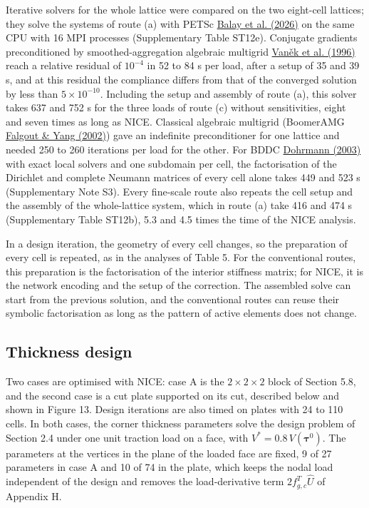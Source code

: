 \documentclass[preprint,12pt,authoryear]{elsarticle}
\begin{document}
Iterative solvers for the whole lattice were compared on the two eight-cell lattices; they solve the systems of route (a) with PETSc \href{https://petsc.org/release/manual/}{Balay et al. (2026)} on the same CPU with 16 MPI processes (Supplementary Table ST12e). Conjugate gradients preconditioned by smoothed-aggregation algebraic multigrid \href{https://doi.org/10.1007/BF02238511}{Vaněk et al. (1996)} reach a relative residual of \(10^{-4}\) in 52 to 84 s per load, after a setup of 35 and 39 s, and at this residual the compliance differs from that of the converged solution by less than \(5\times10^{-10}\). Including the setup and assembly of route (a), this solver takes 637 and 752 s for the three loads of route (c) without sensitivities, eight and seven times as long as NICE. Classical algebraic multigrid (BoomerAMG \href{https://doi.org/10.1007/3-540-47789-6_66}{Falgout \& Yang (2002)}) gave an indefinite preconditioner for one lattice and needed 250 to 260 iterations per load for the other. For BDDC \href{https://doi.org/10.1137/S1064827502412887}{Dohrmann (2003)} with exact local solvers and one subdomain per cell, the factorisation of the Dirichlet and complete Neumann matrices of every cell alone takes 449 and 523 s (Supplementary Note S3). Every fine-scale route also repeats the cell setup and the assembly of the whole-lattice system, which in route (a) take 416 and 474 s (Supplementary Table ST12b), 5.3 and 4.5 times the time of the NICE analysis.

In a design iteration, the geometry of every cell changes, so the preparation of every cell is repeated, as in the analyses of Table 5. For the conventional routes, this preparation is the factorisation of the interior stiffness matrix; for NICE, it is the network encoding and the setup of the correction. The assembled solve can start from the previous solution, and the conventional routes can reuse their symbolic factorisation as long as the pattern of active elements does not change.

\subsection{Thickness design}

Two cases are optimised with NICE: case A is the \(2\times2\times2\) block of Section 5.8, and the second case is a cut plate supported on its cut, described below and shown in Figure 13. Design iterations are also timed on plates with 24 to 110 cells. In both cases, the corner thickness parameters solve the design problem of Section 2.4 under one unit traction load on a face, with \(V^*=0.8\,V(\boldsymbol\tau^0)\). The parameters at the vertices in the plane of the loaded face are fixed, 9 of 27 parameters in case A and 10 of 74 in the plate, which keeps the nodal load independent of the design and removes the load-derivative term \(2f_{g,c}^T\widehat U\) of Appendix H.
\end{document}
